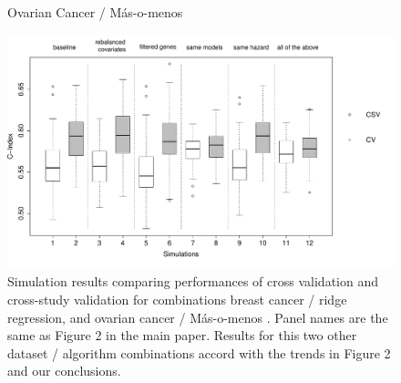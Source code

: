 \documentclass{article}
\begin{document}
   \begin{figure}[H]
   		\centering            
      		\centerline{Ovarian Cancer / M\'{a}s-o-menos}
            \includegraphics[width=16cm]{boxplot_ovarian_masomenos_withnames.pdf}
         \caption{Simulation results comparing performances of cross validation and cross-study validation for combinations breast cancer / ridge regression, and ovarian cancer / M\'{a}s-o-menos . Panel names are the same as Figure 2 in the main paper. Results for this two other dataset / algorithm combinations accord with the trends in Figure 2 and our conclusions.}
         \label{boxplots}
    \end{figure}         


\newpage
\end{document}
